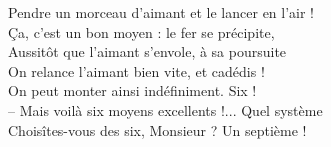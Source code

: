 \documentclass[11pt,a4paper,twoside]{book}
\begin{document}
\begin{fquote}
Pendre un morceau d'aimant et le lancer en l'air !\\
\c{C}a, c'est un bon moyen : le fer se précipite,\\
Aussitôt que l'aimant s'envole, à sa poursuite\\
On relance l'aimant bien vite, et cadédis !\\
On peut monter ainsi indéfiniment.
\DeG{}
\hspace{.6\linewidth} Six !\\
-- Mais voilà six moyens excellents !... Quel système\\
Choisîtes-vous des six, Monsieur ?
\Cyr{}
\hspace{.5\linewidth} Un septième !
\end{fquote}
\thispagestyle{empty}


\newpage $ $
\thispagestyle{empty}
\newpage $ $
\thispagestyle{empty}







\newpage $ $
\thispagestyle{empty}
\newpage $ $
\thispagestyle{empty}

\renewcommand{\bibname}{Bibliographie}
\printbibliography
\thispagestyle{empty}

\backmatter
\end{document}
